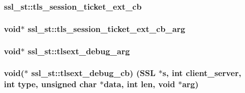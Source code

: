 \subsubsection[{\texorpdfstring{tls\+\_\+session\+\_\+ticket\+\_\+ext\+\_\+cb}{tls_session_ticket_ext_cb}}]{ ssl\+\_\+st\+::tls\+\_\+session\+\_\+ticket\+\_\+ext\+\_\+cb}\hypertarget{structssl__st_adfbd96d1abce945f541c432379fc994f}{}\label{structssl__st_adfbd96d1abce945f541c432379fc994f}
\subsubsection[{\texorpdfstring{tls\+\_\+session\+\_\+ticket\+\_\+ext\+\_\+cb\+\_\+arg}{tls_session_ticket_ext_cb_arg}}]{\setlength{\rightskip}{0pt plus 5cm}void$\ast$ ssl\+\_\+st\+::tls\+\_\+session\+\_\+ticket\+\_\+ext\+\_\+cb\+\_\+arg}\hypertarget{structssl__st_a45dd63c101fc5b96773ab292285962a4}{}\label{structssl__st_a45dd63c101fc5b96773ab292285962a4}
\subsubsection[{\texorpdfstring{tlsext\+\_\+debug\+\_\+arg}{tlsext_debug_arg}}]{\setlength{\rightskip}{0pt plus 5cm}void$\ast$ ssl\+\_\+st\+::tlsext\+\_\+debug\+\_\+arg}\hypertarget{structssl__st_a37c9fa10121176491c8a9e5617f7be83}{}\label{structssl__st_a37c9fa10121176491c8a9e5617f7be83}
\subsubsection[{\texorpdfstring{tlsext\+\_\+debug\+\_\+cb}{tlsext_debug_cb}}]{\setlength{\rightskip}{0pt plus 5cm}void($\ast$ ssl\+\_\+st\+::tlsext\+\_\+debug\+\_\+cb) ({\bf S\+SL} $\ast$s, int client\+\_\+server, int {\bf type}, unsigned char $\ast$data, int {\bf len}, void $\ast$arg)}\hypertarget{structssl__st_af36d613ef84698654b438baf81872ee6}{}\label{structssl__st_af36d613ef84698654b438baf81872ee6}
